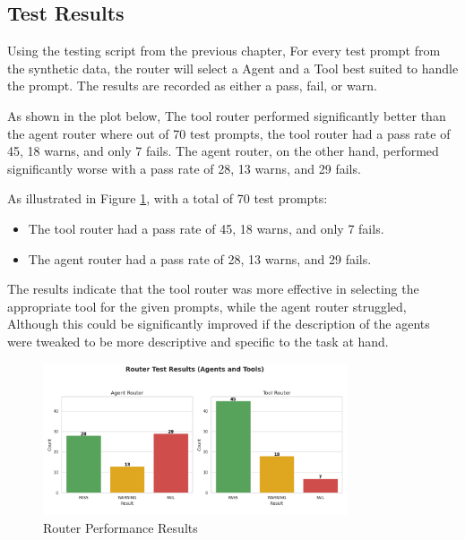 \subsection{Test Results}
\label{sec:results-overview}

Using the testing script from the previous chapter, For every test prompt from the synthetic data, the router will select a Agent and a Tool best suited to handle the prompt. The results are recorded as either a pass, fail, or warn. 

As shown in the plot below, The tool router performed significantly better than the agent router where out of 70 test prompts, the tool router had a pass rate of 45, 18 warns, and only 7 fails. The agent router, on the other hand, performed significantly worse with a pass rate of 28, 13 warns, and 29 fails. 

As illustrated in Figure \ref{fig:router-results},  with a total of 70 test prompts:
\begin{itemize}
    \item The tool router had a pass rate of 45, 18 warns, and only 7 fails.
    \item The agent router had a pass rate of 28, 13 warns, and 29 fails.
\end{itemize}

The results indicate that the tool router was more effective in selecting the appropriate tool for the given prompts, while the agent router struggled, Although this could be significantly improved if the description of the agents were tweaked to be more descriptive and specific to the task at hand. 

\begin{figure}[H]
    \centering
    \includegraphics[width=0.8\textwidth]{figures/plots/router_test_summary.png}
    \caption{Router Performance Results}
    \label{fig:router-results}
\end{figure}



